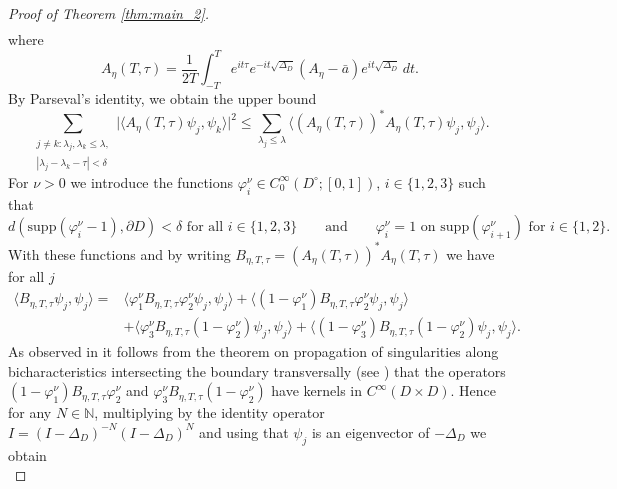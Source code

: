\documentclass[11pt,twoside,reqno]{amsart}
\newcommand{\N}{\mathbb{N}}
\newcommand{\1}{\mathrm{\mathbf{1}}}
\newcommand{\supp}{\mathrm{supp}}
\numberwithin{equation}{section}
\theoremstyle{plain}
\theoremstyle{definition}
\theoremstyle{remark}
\begin{document}
\begin{proof}[Proof of Theorem \ref{thm:main_2}]
\begin{equation}
\begin{aligned}
    \end{aligned}
\end{equation}
where
\begin{equation*}
    A_\eta(T,\tau) = \frac{1}{2T} \int_{-T}^T e^{it\tau} e^{-i t \sqrt{\Delta_D}} (A_\eta - \bar{a}) e^{i t \sqrt{\Delta_D}} \,dt.
\end{equation*}
By Parseval's identity, we obtain the upper bound  
\begin{equation}\label{EQ_main_prop_3_5}
         \sum_{\substack{j\neq k: \lambda_j,\lambda_k\leq \lambda,  \\ |\lambda_{j}-\lambda_{k}-\tau| < \delta}} \big| \langle A_\eta(T,\tau) \psi_j , \psi_k\rangle  \big|^2 
         \leq \sum_{\lambda_j \leq \lambda} \langle ( A_\eta(T,\tau) )^{*}A_\eta(T,\tau) \psi_j , \psi_j\rangle. 
\end{equation}
For $\nu>0$ we introduce the functions $\varphi_i^\nu \in C_0^\infty(D^{\circ}; [0,1])$, $i\in\{1,2,3\}$ such that
\begin{equation*}
    d(\supp(\varphi_i^\nu -1),\partial D)<\delta \text{ for all $i\in\{1,2,3\}$} \qquad\text{and}\qquad \varphi_i^\nu=1 \text{ on $\supp (\varphi_{i+1}^\nu)$ for $i\in\{1,2\}$}.
\end{equation*} 
With these functions and by writing $B_{\eta,T,\tau} =( A_\eta(T,\tau))^{*}A_\eta(T,\tau) $ we have for all $j$
\begin{equation*}
    \begin{aligned}
    \langle B_{\eta,T,\tau} \psi_j , \psi_j\rangle = {}&  
    \langle \varphi_1^\nu B_{\eta,T,\tau} \varphi_2^\nu \psi_j , \psi_j\rangle
    +\langle (1-\varphi_1^\nu) B_{\eta,T,\tau} \varphi_2^\nu \psi_j , \psi_j\rangle
    \\
    &+\langle \varphi_3^\nu B_{\eta,T,\tau}(1- \varphi_2^\nu) \psi_j , \psi_j\rangle
    +\langle (1-\varphi_3^\nu) B_{\eta,T,\tau}(1- \varphi_2^\nu) \psi_j , \psi_j\rangle.
    \end{aligned}
\end{equation*}
As observed in \cite{ZZ96} it follows from the theorem on propagation of singularities along bicharacteristics intersecting the boundary transversally (see \cite[Theorem 24.2.1]{MR2304165}) that the operators $(1-\varphi_1^\nu) B_{\eta,T,\tau} \varphi_2^\nu $ and $\varphi_3^\nu B_{\eta,T,\tau}(1- \varphi_2^\nu)$ have kernels in $C^\infty(D\times D)$. Hence for any $N\in\N$, multiplying by the identity operator $I=(I-\Delta_D)^{-N}(I-\Delta_D)^{N}$ and using that $\psi_j$ is an eigenvector of $-\Delta_D$ we obtain
\begin{equation}

\end{equation}
\end{proof}
\end{document}
